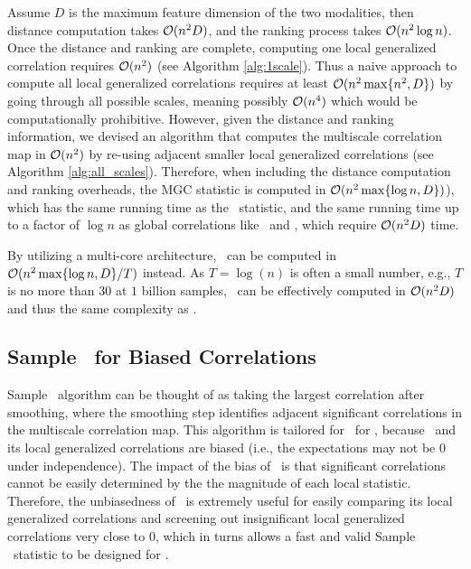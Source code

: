 \documentclass[11pt]{article}
\begin{document}
Assume $D$ is the maximum feature dimension of the two modalities, then distance computation takes $\mathcal{O}(n^2 D)$, and the ranking process takes $\mathcal{O}(n^2 \log n)$. Once the distance and ranking are complete, computing one local generalized correlation requires $\mathcal{O}(n^2)$ (see Algorithm \ref{alg:1scale}). Thus a naive approach to compute all local generalized correlations requires at least $\mathcal{O}(n^2 \max\{n^2, D\})$ by going through all possible scales, meaning possibly $\mathcal{O}(n^4)$ which would be computationally prohibitive. However, given the distance and ranking information, we devised an algorithm that computes the multiscale correlation map in $\mathcal{O}(n^2)$ by re-using adjacent smaller local generalized correlations (see Algorithm \ref{alg:all_scales}). 
Therefore, when including the distance computation and ranking overheads, the MGC statistic is computed in $\mathcal{O}(n^2 \max\{\log n,D\})$), which has the same running time as the \Hhg~statistic, and the same running time up to a factor of $\log n$ as  global correlations like \Dcorr~and \Mcorr, which require  $\mathcal{O}(n^2D)$ time.

By utilizing a multi-core architecture, \Mgc~can be computed in $\mathcal{O}(n^2 \max\{\log n,D\}/T)$ instead. As $T=\log(n)$ is often a small number, e.g., $T$ is no more than $30$ at $1$ billion samples, \Mgc~can be effectively computed in $\mathcal{O}(n^2 D)$ and thus the same complexity as \Dcorr.


\subsection{Sample \Mgc~for Biased Correlations}

Sample \Mgc~algorithm can be thought of as taking the largest correlation after smoothing, where the smoothing step identifies adjacent significant correlations in the multiscale correlation map. This algorithm is tailored for \Mgc~for \Mcorr, because \Dcorr~and its local generalized correlations are biased (i.e., the expectations may not be $0$ under independence). The impact of the bias of \Dcorr~is that significant correlations cannot be easily determined by the the magnitude of each local statistic. Therefore, the unbiasedness of \Mcorr~is extremely useful for easily comparing its local generalized correlations and screening out insignificant local generalized correlations very close to $0$, which in turns allows a fast and valid Sample \Mgc~statistic to be designed for \Mcorr. 
\end{document}
